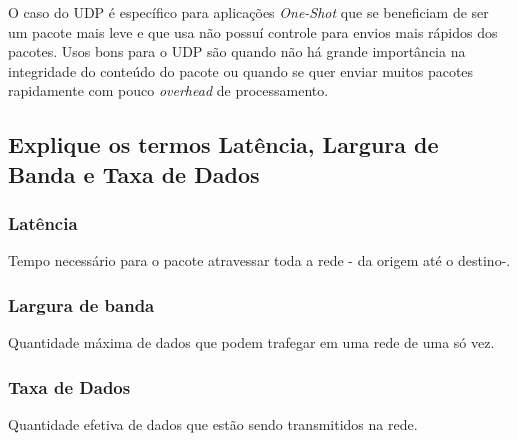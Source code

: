O caso do UDP é específico para aplicações
\emph{One-Shot} que se beneficiam de ser um pacote mais leve e que usa não
possuí controle para envios mais rápidos dos pacotes. Usos bons para o UDP
são quando não há grande importância na integridade do conteúdo do pacote
ou quando se quer enviar muitos pacotes rapidamente com pouco \emph{overhead}
de processamento.

\subsection{Explique os termos Latência, Largura de Banda e Taxa de Dados}

\subsubsection*{Latência}

Tempo necessário para o pacote atravessar toda a rede - da origem até o destino-.

\subsubsection*{Largura de banda}

Quantidade máxima de dados que podem trafegar em uma rede de uma só vez.

\subsubsection*{Taxa de Dados}

Quantidade efetiva de dados que estão sendo transmitidos na rede.